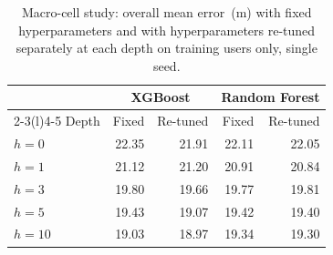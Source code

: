 \begin{table}[h]
  \centering
  \caption{Macro-cell study: overall mean error~(m) with fixed hyperparameters and with hyperparameters re-tuned separately at each depth on training users only, single seed.}
  \label{tab:supp-retune}
  \small
  \begin{tabular}{@{}lrrrr@{}}
    \toprule
     & \multicolumn{2}{c}{XGBoost} & \multicolumn{2}{c}{Random Forest} \\
    \cmidrule(lr){2-3}\cmidrule(l){4-5}
    Depth & Fixed & Re-tuned & Fixed & Re-tuned \\
    \midrule
    $h=0$ & 22.35 & 21.91 & 22.11 & 22.05 \\
    $h=1$ & 21.12 & 21.20 & 20.91 & 20.84 \\
    $h=3$ & 19.80 & 19.66 & 19.77 & 19.81 \\
    $h=5$ & 19.43 & 19.07 & 19.42 & 19.40 \\
    $h=10$ & 19.03 & 18.97 & 19.34 & 19.30 \\
    \bottomrule
  \end{tabular}
\end{table}

